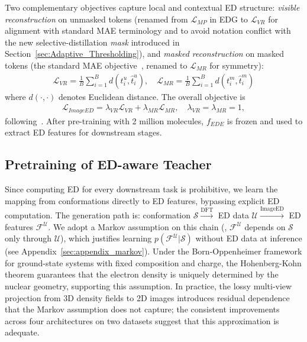Two complementary objectives capture local and contextual ED structure: \emph{visible reconstruction} on unmasked tokens (renamed from $\mathcal{L}_{MP}$ in EDG to $\mathcal{L}_{VR}$ for alignment with standard MAE terminology and to avoid notation conflict with the new selective-distillation \emph{mask} introduced in Section~\ref{sec:Adaptive_Thresholding}), and \emph{masked reconstruction} on masked tokens (the standard MAE objective~\cite{he2022masked}, renamed to $\mathcal{L}_{MR}$ for symmetry):
\begin{align}
\label{Formula_L_VR}
\mathcal{L}_{VR}=\frac{1}{B}\sum_{i=1}^B d(t^u_i, \hat{t}^u_i),\quad
\mathcal{L}_{MR}=\frac{1}{B}\sum_{i=1}^B d(t^m_i, \hat{t}^m_i)
\end{align}
where $d(\cdot,\cdot)$ denotes Euclidean distance. The overall objective is
\begin{align}
\label{Formula_L_ImageED}
\mathcal{L}_{ImageED}=\lambda_{VR}\mathcal{L}_{VR}+\lambda_{MR}\mathcal{L}_{MR},\quad \lambda_{VR}=\lambda_{MR}=1,
\end{align}
following~\cite{xiang2025edg}. After pre-training with 2 million molecules, $f_{EDE}$ is frozen and used to extract ED features for downstream stages.

\subsection{Pretraining of ED-aware Teacher}
\label{sec:Pretraining_of_ED-aware_Teacher}

Since computing ED for every downstream task is prohibitive, we learn the mapping from conformations directly to ED features, bypassing explicit ED computation. The generation path is: conformation $\mathcal{S}\xrightarrow{\text{DFT}}$ ED data $\mathcal{U}\xrightarrow{\text{ImageED}}$ ED features $\mathcal{F}^{\mathcal{U}}$. We adopt a Markov assumption on this chain (\ie, $\mathcal{F}^{\mathcal{U}}$ depends on $\mathcal{S}$ only through $\mathcal{U}$), which justifies learning $p(\mathcal{F}^{\mathcal{U}}|\mathcal{S})$ without ED data at inference (see Appendix~\ref{sec:appendix_markov}). Under the Born-Oppenheimer framework for ground-state systems with fixed composition and charge, the Hohenberg-Kohn theorem guarantees that the electron density is uniquely determined by the nuclear geometry, supporting this assumption. In practice, the lossy multi-view projection from 3D density fields to 2D images introduces residual dependence that the Markov assumption does not capture; the consistent improvements across four architectures on two datasets suggest that this approximation is adequate.

